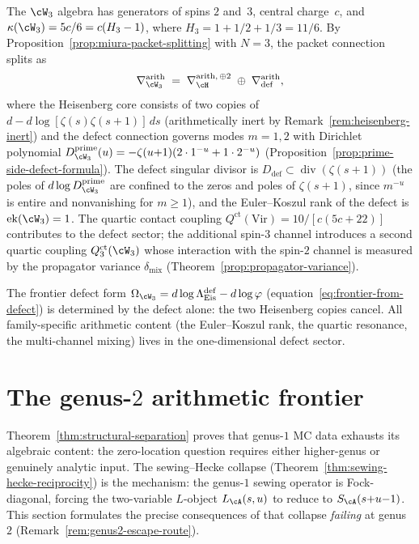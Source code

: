 \begin{example}[$\cW_3$ algebra]%
\label{ex:packet-w3}%
%
%
The $\cW_3$ algebra has generators of spins $2$ and~$3$,
central charge~$c$, and
$\kappa(\cW_3) = 5c/6 = c(H_3 - 1)$, where
$H_3 = 1 + 1/2 + 1/3 = 11/6$.
By Proposition~\ref{prop:miura-packet-splitting} with
$N = 3$, the packet connection splits as
\[
 \nabla_{\cW_3}^{\mathrm{arith}}
 \;=\;
 \nabla_\cH^{\mathrm{arith},\,\oplus 2}
 \;\oplus\;
 \nabla_{\mathrm{def}}^{\mathrm{arith}},
\]
where the Heisenberg core consists of two copies of
$d - d\log[\zeta(s)\zeta(s{+}1)]\,ds$
(arithmetically inert by Remark~\ref{rem:heisenberg-inert})
and the defect connection governs modes $m = 1, 2$ with
Dirichlet polynomial
$D_{\cW_3}^{\mathrm{prime}}(u)
= -\zeta(u{+}1)(2\cdot 1^{-u} + 1\cdot 2^{-u})$
(Proposition~\ref{prop:prime-side-defect-formula}).
The defect singular divisor is
$D_{\mathrm{def}} \subset
\operatorname{div}(\zeta(s{+}1))$
(the poles of $d\log D_{\cW_3}^{\mathrm{prime}}$ are
confined to the zeros and poles of $\zeta(s{+}1)$,
since $m^{-u}$ is entire and nonvanishing for $m \geq 1$),
and the Euler--Koszul rank of the defect is
$\operatorname{ek}(\cW_3) = 1$.
The quartic contact coupling
$Q^{\mathrm{ct}}(\mathrm{Vir}) = 10/[c(5c{+}22)]$
contributes to the defect sector; the additional
spin-$3$ channel introduces a second quartic coupling
$Q_3^{\mathrm{ct}}(\cW_3)$ whose interaction with
the spin-$2$ channel is measured by the propagator variance
$\delta_{\mathrm{mix}}$ (Theorem~\ref{prop:propagator-variance}).

The frontier defect form
$\Omega_{\cW_3} = d\log\Lambda_{\mathrm{Eis}}^{\mathrm{def}}
- d\log\varphi$
(equation~\eqref{eq:frontier-from-defect}) is determined by
the defect alone: the two Heisenberg copies cancel.
All family-specific arithmetic content (the Euler--Koszul
rank, the quartic resonance, the multi-channel mixing) lives
in the one-dimensional defect sector.
\end{example}

\section{The genus-$2$ arithmetic frontier}%
\label{sec:genus2-arithmetic-frontier}%

Theorem~\ref{thm:structural-separation} proves that genus-$1$
MC data exhausts its algebraic content: the zero-location
question requires either higher-genus or genuinely analytic
input. The sewing--Hecke collapse
(Theorem~\ref{thm:sewing-hecke-reciprocity}) is the
mechanism: the genus-$1$ sewing operator is Fock-diagonal,
forcing the two-variable $L$-object $L_\cA(s,u)$ to reduce
to $S_\cA(s{+}u{-}1)$. This section formulates the precise
consequences of that collapse \emph{failing} at genus~$2$
(Remark~\ref{rem:genus2-escape-route}).

